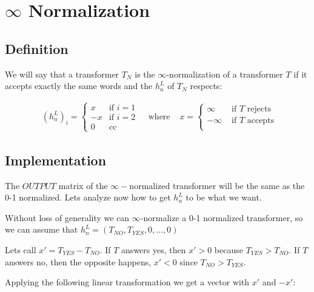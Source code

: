 \section*{$\infty$ Normalization}

\subsection*{Definition}

We will say that a transformer $T_N$ is the $\infty$-normalization of a transformer $T$ if it accepts exactly the same words and the $h_n^L$ of $T_N$ respects:


\begin{align*}
    & (h_n^L)_i =
    \begin{cases}
    x & \text{if } i = 1 \\
    -x & \text{if } i = 2 \\
    0 & \text{cc }
    \end{cases} 
    & \text{ where }
    & x = 
    \begin{cases}
    \infty & \text{ if $T$ rejects }  \\
    -\infty & \text{ if $T$ accepts } \\
    \end{cases} 
\end{align*}


\subsection*{Implementation}
The $OUTPUT$ matrix of the $\infty-$normalized transformer will be the same as the 0-1 normalized. Lets analyze now how to get $h_n^L$ to be what we want.

Without loss of generality we can $\infty$-normalize a 0-1 normalized transformer, so we can assume that $h_n^L = (T_{NO}, T_{YES}, 0, \dots, 0)$

Lets call $x' = T_{YES} - T_{NO}$. If $T$ answers yes, then $x' > 0$ because $T_{YES} > T_{NO}$. If $T$ answers no, then the opposite happens, $x' < 0$ since $T_{NO} > T_{YES}$.

Applying the following linear transformation we get a vector with $x'$ and $-x'$:

